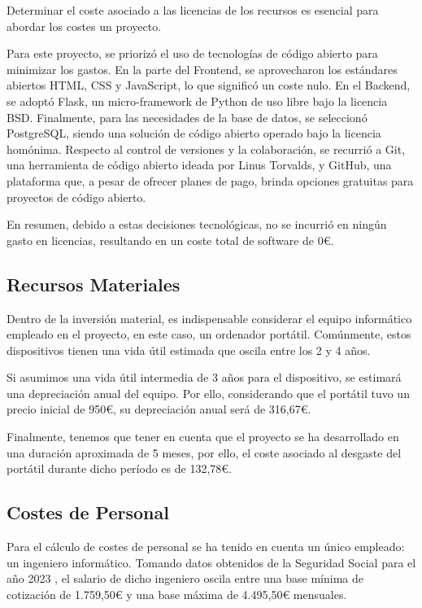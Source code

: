 Determinar el coste asociado a las licencias de los recursos es esencial para abordar los costes un proyecto.

Para este proyecto, se priorizó el uso de tecnologías de código abierto para minimizar los gastos. En la parte del Frontend, se aprovecharon los estándares abiertos HTML, CSS y JavaScript, lo que significó un coste nulo. En el Backend, se adoptó Flask, un micro-framework de Python de uso libre bajo la licencia BSD. Finalmente, para las necesidades de la base de datos, se seleccionó PostgreSQL, siendo una solución de código abierto operado bajo la licencia homónima. Respecto al control de versiones y la colaboración, se recurrió a Git, una herramienta de código abierto ideada por Linus Torvalds, y GitHub, una plataforma que, a pesar de ofrecer planes de pago, brinda opciones gratuitas para proyectos de código abierto. 

En resumen, debido a estas decisiones tecnológicas, no se incurrió en ningún gasto en licencias, resultando en un coste total de software de 0€.

\subsection{Recursos Materiales}

Dentro de la inversión material, es indispensable considerar el equipo informático empleado en el proyecto, en este caso, un ordenador portátil. Comúnmente, estos dispositivos tienen una vida útil estimada que oscila entre los 2 y 4 años. 

Si asumimos una vida útil intermedia de 3 años para el dispositivo, se estimará una depreciación anual del equipo. Por ello, considerando que el portátil tuvo un precio inicial de 950€, su depreciación anual será de 316,67€. 

Finalmente, tenemos que tener en cuenta que el proyecto se ha desarrollado en una duración aproximada de 5 meses, por ello, el coste asociado al desgaste del portátil durante dicho período es de 132,78€.

\subsection{Costes de Personal}

Para el cálculo de costes de personal se ha tenido en cuenta un único empleado: un ingeniero informático. Tomando datos obtenidos de la Seguridad Social para el año 2023 \cite{seg-social}, el salario de dicho ingeniero oscila entre una base mínima de cotización de 1.759,50€ y una base máxima de 4.495,50€ mensuales.

